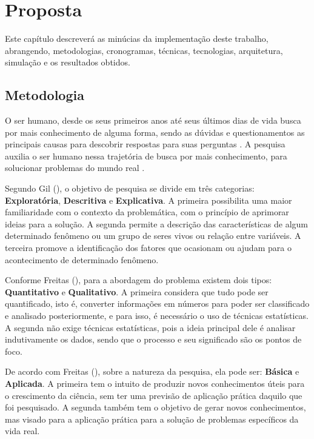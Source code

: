 \chapter{Proposta}
\label{proposta}

Este capítulo descreverá as minúcias da implementação deste trabalho, abrangendo, metodologias, cronogramas, técnicas, tecnologias, arquitetura, simulação e os resultados obtidos.

\section{Metodologia}

O ser humano, desde os seus primeiros anos até seus últimos dias de vida busca por mais conhecimento de alguma forma, sendo as dúvidas e questionamentos as principais causas para descobrir respostas para suas perguntas \cite{Paschoarelli_Medola_Bonfim_2018}. A pesquisa auxilia o ser humano nessa trajetória de busca por mais conhecimento, para solucionar problemas do mundo real \cite{gil:2008}.

Segundo Gil (\citeyear{gil:2002}), o objetivo de pesquisa se divide em três categorias: \textbf{Exploratória}, \textbf{Descritiva} e \textbf{Explicativa}. A primeira possibilita uma maior familiaridade com o contexto da problemática, com o princípio de aprimorar ideias para a solução. A segunda permite a descrição das características de algum determinado fenômeno ou um grupo de seres vivos ou relação entre variáveis. A terceira promove a identificação dos fatores que ocasionam ou ajudam para o acontecimento de determinado fenômeno.

Conforme Freitas (\citeyear{de2013metodologia}), para a abordagem do problema existem dois tipos: \textbf{Quantitativo} e \textbf{Qualitativo}. A primeira considera que tudo pode ser quantificado, isto é, converter informações em números para poder ser classificado e analisado posteriormente, e para isso, é necessário o uso de técnicas estatísticas. A segunda não exige técnicas estatísticas, pois a ideia principal dele é analisar indutivamente os dados, sendo que o processo e seu significado são os pontos de foco.

De acordo com Freitas (\citeyear{de2013metodologia}), sobre a natureza da pesquisa, ela pode ser: \textbf{Básica} e \textbf{Aplicada}. A primeira tem o intuito de produzir novos conhecimentos úteis para o crescimento da ciência, sem ter uma previsão de aplicação prática daquilo que foi pesquisado. A segunda também tem o objetivo de gerar novos conhecimentos, mas visado para a aplicação prática para a solução de problemas específicos da vida real.

